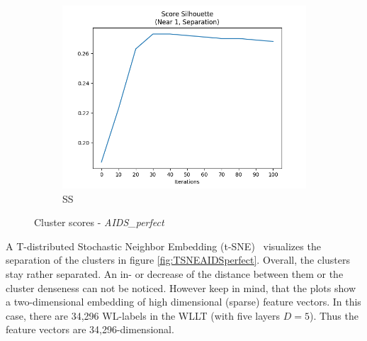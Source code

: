 \begin{figure}[H]
\begin{subfigure}{0.3\textwidth}
				\centering
				\includegraphics[width=1.1\linewidth]{images/plotA0_SS_AIDSPerfect_E_GDL_09_22h-03m}
				\caption{SS}
				\label{fig:plota0ssaidsperfectegdl0922h-03m}
			\end{subfigure}
			\caption{Cluster scores - \textit{AIDS\_perfect}}
			\label{fig:ClScoresAIDSperfect}
		\end{figure}
		
		A T-distributed Stochastic Neighbor Embedding (t-SNE)~\cite{2008_Maaten_CONF} visualizes the separation of the clusters in figure \ref{fig:TSNEAIDSperfect}.
		Overall, the clusters stay rather separated.
		An in- or decrease of the distance between them or the cluster denseness can not be noticed.
		However keep in mind, that the plots show a two-dimensional embedding of high dimensional (sparse) feature vectors.
		In this case, there are 34,296 WL-labels in the WLLT (with five layers $D=5$).
		Thus the feature vectors are 34,296-dimensional.
				
